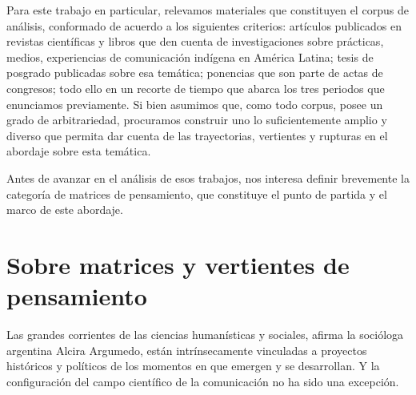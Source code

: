 \documentclass{tufte-handout}
\begin{document}
Para este trabajo en particular, relevamos materiales que constituyen el
corpus de análisis, conformado de acuerdo a los siguientes criterios:
artículos publicados en revistas científicas y libros que den cuenta de
investigaciones sobre prácticas, medios, experiencias de comunicación
indígena en América Latina; tesis de posgrado publicadas sobre esa
temática; ponencias que son parte de actas de congresos; todo ello en un
recorte de tiempo que abarca los tres periodos que enunciamos
previamente. Si bien asumimos que, como todo corpus, posee un grado de
arbitrariedad, procuramos construir uno lo suficientemente amplio y
diverso que permita dar cuenta de las trayectorias, vertientes y
rupturas en el abordaje sobre esta temática.

Antes de avanzar en el análisis de esos trabajos, nos interesa definir
brevemente la categoría de matrices de pensamiento, que constituye el
punto de partida y el marco de este abordaje.

\hypertarget{sobre-matrices-y-vertientes-de-pensamiento}{%
\section{Sobre matrices y vertientes de
pensamiento}\label{sobre-matrices-y-vertientes-de-pensamiento}}

\enlargethispage{\baselineskip}

Las grandes corrientes de las ciencias humanísticas y sociales, afirma
la socióloga argentina Alcira Argumedo, están intrínsecamente vinculadas
a proyectos históricos y políticos de los momentos en que emergen y se
desarrollan. Y la configuración del campo científico de la comunicación
no ha sido una excepción.
\end{document}
